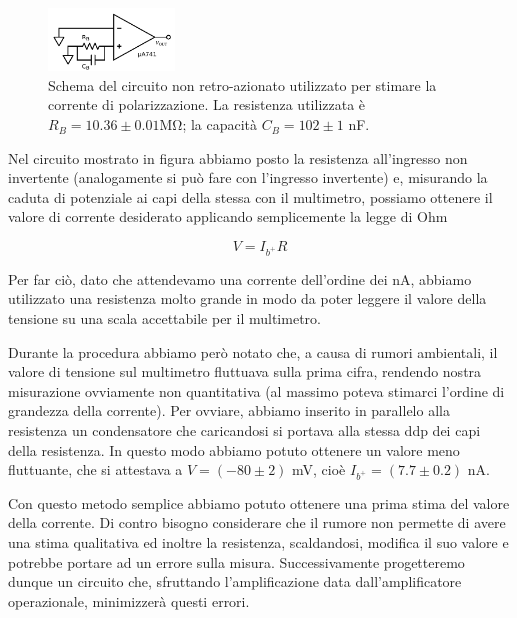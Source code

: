 \begin{figure}
  \begin{center}
    \includegraphics[width=0.30\textwidth]{../E02/latex/direct_measure.pdf}
  \end{center}
  \caption{Schema del circuito non retro-azionato utilizzato per stimare la corrente di polarizzazione. La resistenza utilizzata è $R_B=10.36\pm0.01$\si{\mega\ohm}; la capacità $C_B=102 \pm 1$ \si{\nano\farad}.}
  \label{circuito:rel2_correnti_senzaretroazione}
\end{figure}

Nel circuito mostrato in figura abbiamo posto la resistenza all'ingresso non invertente (analogamente si può fare con l'ingresso invertente) e, misurando la caduta di potenziale ai capi della stessa con il multimetro, possiamo ottenere il valore di corrente desiderato applicando semplicemente la legge di Ohm

$$V=I_{b^+} R$$

Per far ciò, dato che attendevamo una corrente dell'ordine dei \si{\nano\ampere}, abbiamo utilizzato una resistenza molto grande in modo da poter leggere il valore della tensione su una scala accettabile per il multimetro.

Durante la procedura abbiamo però notato che, a causa di rumori ambientali, il valore di tensione sul multimetro fluttuava sulla prima cifra, rendendo nostra misurazione ovviamente non quantitativa (al massimo poteva stimarci l'ordine di grandezza della corrente). Per ovviare, abbiamo inserito in parallelo alla resistenza un condensatore che caricandosi si portava alla stessa ddp dei capi della resistenza. In questo modo abbiamo potuto ottenere un valore meno fluttuante, che si attestava a $V=(-80 \pm 2)$ \si{\milli\volt}, cioè $I_{b^+}=(7.7 \pm 0.2)$ \si{\nano\ampere}.

Con questo metodo semplice abbiamo potuto ottenere una prima stima del valore della corrente. Di contro bisogno considerare che il rumore non permette di avere una stima qualitativa ed inoltre la resistenza, scaldandosi, modifica il suo valore e potrebbe portare ad un errore sulla misura. Successivamente progetteremo dunque un circuito che, sfruttando l'amplificazione data dall'amplificatore operazionale, minimizzerà questi errori.

